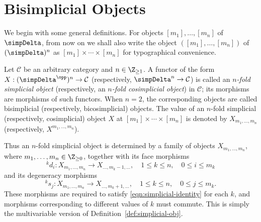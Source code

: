 
\section{Bisimplicial Objects}\label{sec:bisimplicial}
\hypertarget{o014.aljabr2.chapter8.bisimplicial-a}{ }
We begin with some general definitions. For objects
$[m_1],\ldots,[m_n]$ of $\simpDelta$, from now on we shall also write the
object $([m_1],\ldots,[m_n])$ of $(\simpDelta)^n$ as
$[m_1]\times\cdots\times[m_n]$ for typographical convenience.

\begin{definition}
	Let $\mathcal{C}$ be an arbitrary category and $n\in\Z_{\geq1}$. A
	functor of the form $X:(\simpDelta^{\opp})^n\to\mathcal{C}$
	(respectively, $\simpDelta^n\to\mathcal{C}$) is called an
	\emph{$n$-fold simplicial object} (respectively, an \emph{$n$-fold
	cosimplicial object}) in $\mathcal{C}$; its morphisms are morphisms of
	such functors. When $n=2$, the corresponding objects are called
	bisimplicial (respectively, bicosimplicial) objects. The value of an
	$n$-fold simplicial (respectively, cosimplicial) object $X$ at
	$[m_1]\times\cdots\times[m_n]$ is denoted by $X_{m_1,\ldots,m_n}$
	(respectively, $X^{m_1,\ldots,m_n}$).
\end{definition}

Thus an $n$-fold simplicial object is determined by a family of objects
$X_{m_1,\ldots,m_n}$, where $m_1,\ldots,m_n\in\Z_{\geq0}$, together with
its face morphisms
\[ {}^k d_i: X_{m_1, \ldots, m_n} \to X_{\ldots, m_k - 1, \ldots}, \quad 1 \leq k \leq n, \quad 0 \leq i \leq m_k \]
and its degeneracy morphisms
\[ {}^k s_j: X_{m_1, \ldots, m_n} \to X_{\ldots, m_k + 1, \ldots}, \quad 1 \leq k \leq n, \quad 0 \leq j \leq m_k . \]
These morphisms are required to satisfy \eqref{eqn:simplicial-identity} for
each $k$, and morphisms corresponding to different values of $k$ must
commute. This is simply the multivariable version of
Definition~\ref{def:simplicial-obj}.

